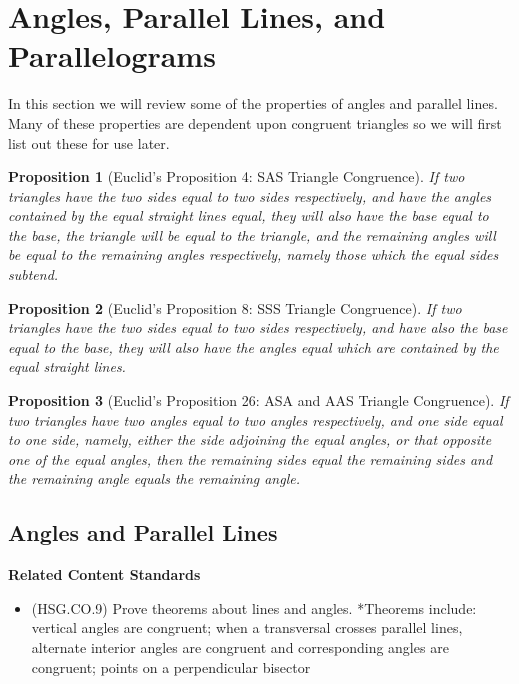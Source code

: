 \documentclass[
]{book}
\providecommand{\tightlist}{%
  \setlength{\itemsep}{0pt}\setlength{\parskip}{0pt}}
\newenvironment{standards}{}{}
\newtheorem{proposition}{Proposition}[chapter]
\theoremstyle{definition}
\theoremstyle{definition}
\theoremstyle{definition}
\theoremstyle{definition}
\theoremstyle{remark}
\begin{document}
\hypertarget{angles-parallel-lines-and-parallelograms}{%
\section{Angles, Parallel Lines, and Parallelograms}\label{angles-parallel-lines-and-parallelograms}}

In this section we will review some of the properties of angles and parallel lines. Many of these properties are dependent upon congruent triangles so we will first list out these for use later.

\begin{proposition}[Euclid's Proposition 4: SAS Triangle Congruence]
If two triangles have the two sides equal to two sides respectively, and have the angles contained by the equal straight lines equal, they will also have the base equal to the base, the triangle will be equal to the triangle, and the remaining angles will be equal to the remaining angles respectively, namely those which the equal sides subtend.
\end{proposition}

\begin{proposition}[Euclid's Proposition 8: SSS Triangle Congruence]
If two triangles have the two sides equal to two sides respectively, and have also the base equal to the base, they will also have the angles equal which are contained by the equal straight lines.
\end{proposition}

\begin{proposition}[Euclid's Proposition 26: ASA and AAS Triangle Congruence]
\protect\hypertarget{prp:prop26}{}\label{prp:prop26}If two triangles have two angles equal to two angles respectively, and one side equal to one side, namely, either the side adjoining the equal angles, or that opposite one of the equal angles, then the remaining sides equal the remaining sides and the remaining angle equals the remaining angle.
\end{proposition}

\hypertarget{angles-and-parallel-lines}{%
\subsection{Angles and Parallel Lines}\label{angles-and-parallel-lines}}

\begin{standards}

\begin{center}
\textbf{Related Content Standards}

\end{center}

\begin{itemize}
\tightlist
\item
  (HSG.CO.9) Prove theorems about lines and angles. *Theorems include: vertical angles are congruent; when a transversal crosses parallel lines, alternate interior angles are congruent and corresponding angles are congruent; points on a perpendicular bisector
\end{itemize}

\end{standards}
\end{document}
